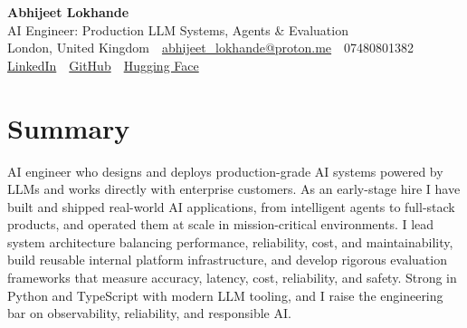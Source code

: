 \documentclass[10pt,a4paper]{article}
\newcommand{\sep}{\,\textcolor{accent!60}{\textbar}\,}
\begin{document}
\begin{center}
  {\fontsize{24}{26}\selectfont\bfseries Abhijeet Lokhande}\\[3pt]
  {\color{accent}\large AI Engineer: Production LLM Systems, Agents \& Evaluation}\\[5pt]
  {\small
    London, United Kingdom \sep
    \href{mailto:abhijeet_lokhande@proton.me}{abhijeet\_lokhande@proton.me} \sep
    07480801382 \\[2pt]
    \href{https://www.linkedin.com/in/ablds/}{LinkedIn} \sep
    \href{https://github.com/abhijeetscode}{GitHub} \sep
    \href{https://huggingface.co/ab-ai}{Hugging Face}
  }
\end{center}
\vspace{2pt}

\section{Summary}
AI engineer who designs and deploys production-grade AI systems powered by LLMs and works directly with enterprise customers. As an early-stage hire I have built and shipped real-world AI applications, from intelligent agents to full-stack products, and operated them at scale in mission-critical environments. I lead system architecture balancing performance, reliability, cost, and maintainability, build reusable internal platform infrastructure, and develop rigorous evaluation frameworks that measure accuracy, latency, cost, reliability, and safety. Strong in Python and TypeScript with modern LLM tooling, and I raise the engineering bar on observability, reliability, and responsible AI.

\end{document}
